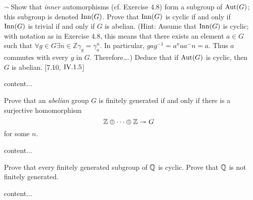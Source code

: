 \begin{exercise}
	$\neg$ Show that \emph{inner} automorphisms (cf. Exercise 4.8) form a subgroup of $\operatorname{Aut}(G)$; this subgroup is denoted $\operatorname{Inn}(G)$. Prove that $\operatorname{Inn}(G)$ is cyclic if and only if $\operatorname{Inn}(G)$ is trivial if and only if $G$ is abelian. (Hint: Assume that $\operatorname{Inn}(G)$ is cyclic; with notation as in Exercise 4.8, this means that there exists an element $a\in G$ such that $\forall g\in G\exists n \in \mathbb{Z} \gamma_g = \gamma_a^n$. In particular, $gag^{-1}= a^n a a^-n = a$. Thus $a$ commutes with every $g$ in $G$. Therefore\ldots .) Deduce that if $\operatorname{Aut}(G)$ is cyclic, then $G$ is abelian. [7.10, $\RNo{4}.1.5$]
\end{exercise}
\begin{solution}
	content...
\end{solution}

\begin{exercise}
	Prove that an \emph{abelian} group $G$ is finitely generated if and only if there is a surjective homomorphism
	\[
		\mathbb{Z} \oplus \cdots \oplus \mathbb{Z} \twoheadrightarrow G
	\]
	for some $n$.
\end{exercise}
\begin{solution}
	content...
\end{solution}

\begin{exercise}
	Prove that every finitely generated subgroup of $\mathbb{Q}$ is cyclic. Prove that $\mathbb{Q}$ is not finitely generated.
\end{exercise}
\begin{solution}
	content...
\end{solution}

